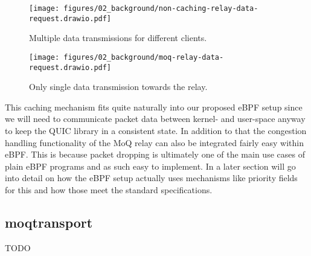 \begin{figure}[!htb]
    \begin{minipage}{0.45\textwidth}
        \centering
        \texttt{[image: figures/02\_background/non-caching-relay-data-request.drawio.pdf]}
        \caption{Multiple data transmissions for different clients.}\label{fig:non_caching_relay_data_request}
    \end{minipage}\hfill
    \begin{minipage}{0.45\textwidth}
        \centering
        \texttt{[image: figures/02\_background/moq-relay-data-request.drawio.pdf]}
        \caption{Only single data transmission towards the relay.}\label{fig:moq_relay_data_request}
    \end{minipage}
\end{figure}

This caching mechanism fits quite naturally into our proposed eBPF setup since we will need to 
communicate packet data between kernel- and user-space anyway to keep the QUIC library in a 
consistent state.
In addition to that the congestion handling functionality of the MoQ relay can also
be integrated fairly easy within eBPF\@.
This is because packet dropping is ultimately one of the main use cases of plain eBPF 
programs and as such easy to implement.
In a later section will go into detail on how the eBPF setup actually uses mechanisms like 
priority fields for this and how those meet the standard specifications.

\subsection{moqtransport}
TODO
